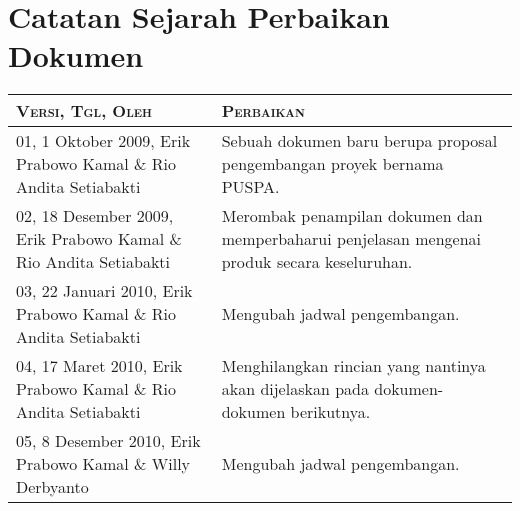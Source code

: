 \part*{\centering \textsf{\Large Catatan Sejarah Perbaikan Dokumen}}

\vspace{0.2cm}
\begin{tabular}{|p{4cm}|p{11cm}|}
\hline
{\scshape Versi, Tgl, Oleh} & {\scshape Perbaikan}\\
\hline
01, 1 Oktober 2009, Erik Prabowo Kamal \& Rio Andita Setiabakti & Sebuah dokumen baru berupa proposal pengembangan proyek bernama PUSPA.\\
\hline
02, 18 Desember 2009, Erik Prabowo Kamal \& Rio Andita Setiabakti & Merombak penampilan dokumen dan memperbaharui penjelasan mengenai produk secara keseluruhan.\\
\hline
03, 22 Januari 2010, Erik Prabowo Kamal \& Rio Andita Setiabakti & Mengubah jadwal pengembangan.\\
\hline
04, 17 Maret 2010, Erik Prabowo Kamal \& Rio Andita Setiabakti & Menghilangkan rincian yang nantinya akan dijelaskan pada dokumen-dokumen berikutnya.\\
\hline
05, 8 Desember 2010, Erik Prabowo Kamal \& Willy Derbyanto & Mengubah jadwal pengembangan.\\
\hline
\end{tabular}
